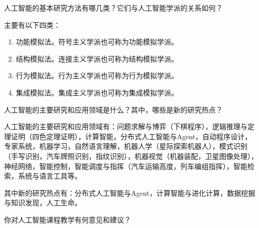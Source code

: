 \begin{question}
人工智能的基本研究方法有哪几类？它们与人工智能学派的关系如何？
\end{question}
\begin{solution}
主要有以下四类：
	\begin{enumerate}
		\item 功能模拟法。符号主义学派也可称为功能模拟学派。
		\item 结构模拟法。连接主义学派也可称为结构模拟学派。
		\item 行为模拟法。行为主义学派也可称为行为模拟学派。
		\item 集成模拟法。集成主义学派也可称为集成模拟学派。
	\end{enumerate}
\end{solution}

\begin{question}
人工智能的主要研究和应用领域是什么？其中，哪些是新的研究热点？
\end{question}
\begin{solution}
人工智能的主要研究和应用领域有：问题求解与博弈（下棋程序），逻辑推理与定理证明（四色定理证明），计算智能，分布式人工智能与Agent，自动程序设计，专家系统，机器学习，自然语言理解，机器人学（星际探索机器人），模式识别（手写识别，汽车牌照识别，指纹识别），机器视觉（机器装配，卫星图像处理），神经网络，智能控制，智能调度与指挥（汽车运输高度，列车编组指挥），智能检索，系统与语言工具等。 \par
其中新的研究热点有：分布式人工智能与Agent，计算智能与进化计算，数据挖掘与知识发现，人工生命。
\end{solution}

\begin{question}
你对人工智能课程教学有何意见和建议？
\end{question}